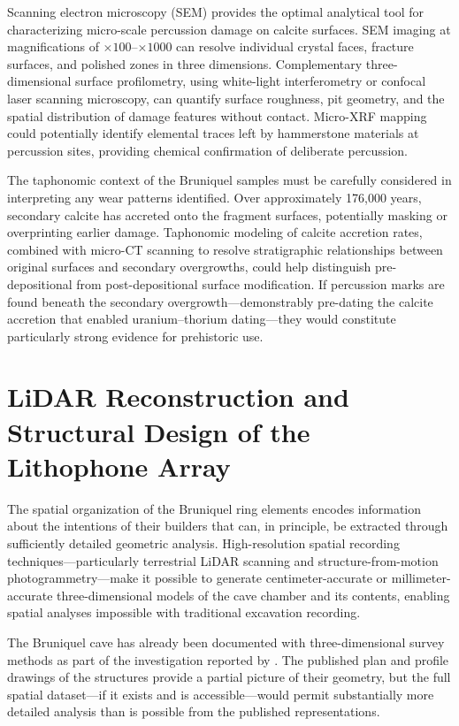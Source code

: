 \documentclass[12pt]{article}
\begin{document}
Scanning electron microscopy (SEM) provides the optimal analytical tool for characterizing micro-scale percussion damage on calcite surfaces. SEM imaging at magnifications of $\times 100$--$\times 1000$ can resolve individual crystal faces, fracture surfaces, and polished zones in three dimensions. Complementary three-dimensional surface profilometry, using white-light interferometry or confocal laser scanning microscopy, can quantify surface roughness, pit geometry, and the spatial distribution of damage features without contact. Micro-XRF mapping could potentially identify elemental traces left by hammerstone materials at percussion sites, providing chemical confirmation of deliberate percussion.

The taphonomic context of the Bruniquel samples must be carefully considered in interpreting any wear patterns identified. Over approximately 176,000 years, secondary calcite has accreted onto the fragment surfaces, potentially masking or overprinting earlier damage. Taphonomic modeling of calcite accretion rates, combined with micro-CT scanning to resolve stratigraphic relationships between original surfaces and secondary overgrowths, could help distinguish pre-depositional from post-depositional surface modification. If percussion marks are found beneath the secondary overgrowth—demonstrably pre-dating the calcite accretion that enabled uranium--thorium dating—they would constitute particularly strong evidence for prehistoric use.

\section{LiDAR Reconstruction and Structural Design of the Lithophone Array}

The spatial organization of the Bruniquel ring elements encodes information about the intentions of their builders that can, in principle, be extracted through sufficiently detailed geometric analysis. High-resolution spatial recording techniques—particularly terrestrial LiDAR scanning and structure-from-motion photogrammetry—make it possible to generate centimeter-accurate or millimeter-accurate three-dimensional models of the cave chamber and its contents, enabling spatial analyses impossible with traditional excavation recording.

The Bruniquel cave has already been documented with three-dimensional survey methods as part of the investigation reported by \citet{Jaubert2016}. The published plan and profile drawings of the structures provide a partial picture of their geometry, but the full spatial dataset—if it exists and is accessible—would permit substantially more detailed analysis than is possible from the published representations.
\end{document}
